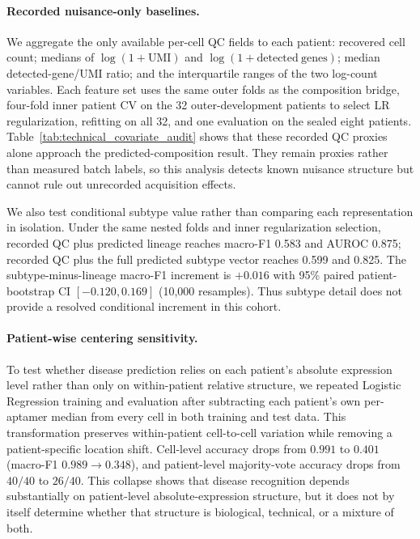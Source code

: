 \documentclass{article} %
\begin{document}
\paragraph{Recorded nuisance-only baselines.}
We aggregate the only available per-cell QC fields to each patient: recovered
cell count; medians of $\log(1+\mathrm{UMI})$ and
$\log(1+\mathrm{detected\ genes})$; median detected-gene/UMI ratio; and the
interquartile ranges of the two log-count variables. Each feature set uses the
same outer folds as the composition bridge, four-fold inner patient CV on the
32 outer-development patients to select LR regularization, refitting on all 32,
and one evaluation on the sealed eight patients. Table~\ref{tab:technical_covariate_audit}
shows that these recorded QC proxies alone approach the predicted-composition
result. They remain proxies rather than measured batch labels, so this analysis
detects known nuisance structure but cannot rule out unrecorded acquisition
effects.

We also test conditional subtype value rather than comparing each representation
in isolation. Under the same nested folds and inner regularization selection,
recorded QC plus predicted lineage reaches macro-F1 0.583 and AUROC 0.875;
recorded QC plus the full predicted subtype vector reaches 0.599 and 0.825. The
subtype-minus-lineage macro-F1 increment is $+0.016$ with 95\% paired
patient-bootstrap CI $[-0.120,0.169]$ (10{,}000 resamples). Thus subtype detail
does not provide a resolved conditional increment in this cohort.





\paragraph{Patient-wise centering sensitivity.}
To test whether disease prediction relies on each patient's absolute expression level rather than only on within-patient relative structure, we repeated Logistic Regression training and evaluation after subtracting each patient's own per-aptamer median from every cell in both training and test data. This transformation preserves within-patient cell-to-cell variation while removing a patient-specific location shift. Cell-level accuracy drops from $0.991$ to $0.401$ (macro-F1 $0.989 \to 0.348$), and patient-level majority-vote accuracy drops from $40/40$ to $26/40$. This collapse shows that disease recognition depends substantially on patient-level absolute-expression structure, but it does not by itself determine whether that structure is biological, technical, or a mixture of both.
\end{document}
